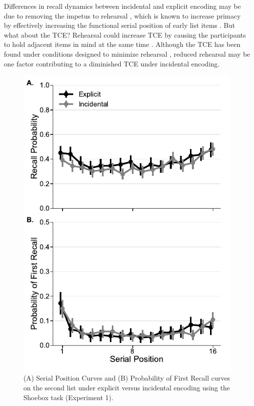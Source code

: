 \documentclass[man,natbib,floatsintext]{apa6} %
\begin{document}
Differences in recall dynamics between incidental and explicit encoding may be due to removing the impetus to rehearsal \citep{MarsWerd72,Neat93,GlenEtal80}, which is known to increase primacy by effectively increasing the  functional serial position of early list items \citep{WARD,LAM}. But what about the TCE? Rehearsal could increase TCE by causing the participants to hold adjacent items in mind at the same time \cite{HINTsaythis?}. Although the TCE has been found under conditions designed to minimize rehearsal \citep{REC}, reduced rehearsal may be one factor contributing to a diminished TCE under incidental encoding. 

\begin{figure}
\includegraphics{figures/E1_spc_list2.pdf}
\caption{(A) Serial Position Curves and (B) Probability of First Recall curves on the second list under explicit versus incidental encoding using the Shoebox task (Experiment 1). \spcpaneltext}
\label{e1_l2_spc}
\end{figure}
\end{document}

